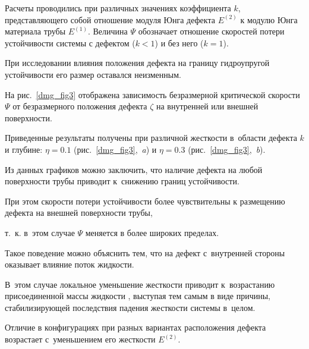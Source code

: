 Расчеты проводились при различных значениях коэффициента $k$, представляющего собой отношение модуля Юнга дефекта $E^{(2)}$ к модулю Юнга материала трубы $E^{(1)}$. Величина $\Psi$ обозначает отношение скоростей потери устойчивости системы с дефектом ($k < 1$) и без него ($k = 1$).



При исследовании влияния положения дефекта на границу гидроупругой устойчивости его размер оставался неизменным. 

На рис.~\ref{dmg_fig3} отображена зависимость безразмерной критической скорости $\Psi$ от безразмерного положения дефекта $\zeta$ на внутренней или внешней поверхности. 

Приведенные результаты получены при различной жесткости в~области дефекта $k$ и глубине: $\eta = 0.1$ (рис.~\ref{dmg_fig3},~{\sl a}) и $\eta = 0.3$ (рис.~\ref{dmg_fig3},~{\sl b}). 

Из данных графиков можно заключить, что наличие дефекта на любой поверхности трубы приводит к~снижению границ устойчивости. 

При этом скорости потери устойчивости более чувствительны к размещению дефекта на внешней поверхности трубы, 

т.~к. в~этом случае $\Psi$ меняется в более широких пределах. 

Такое поведение можно объяснить тем, что на дефект с~внутренней стороны оказывает влияние поток жидкости. 

В~этом случае локальное уменьшение жесткости приводит к~возрастанию присоединенной массы жидкости \cite{13_Paidoussis}, выступая тем самым в виде причины, стабилизирующей последствия падения жесткости системы в~целом. 

Отличие в конфигурациях при разных вариантах расположения дефекта возрастает с~уменьшением его жесткости $E^{(2)}$.



